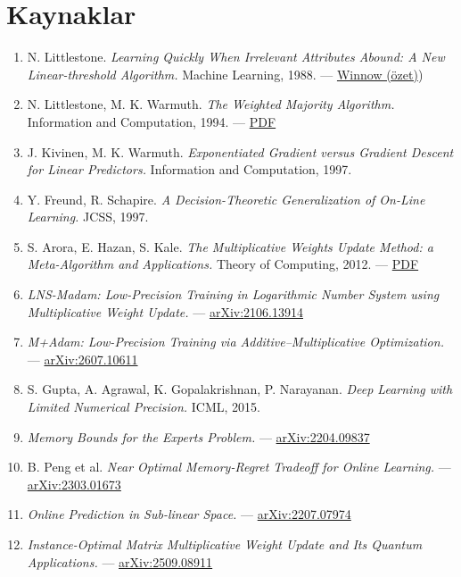 \documentclass[11pt]{article}
\begin{document}
\section*{Kaynaklar}
\begin{enumerate}\item N. Littlestone. \emph{Learning Quickly When Irrelevant Attributes Abound: A New Linear-threshold Algorithm.} Machine Learning, 1988. — \href{https://en.wikipedia.org/wiki/Winnow_(algorithm}{Winnow (özet)})
\item N. Littlestone, M. K. Warmuth. \emph{The Weighted Majority Algorithm.} Information and Computation, 1994. — \href{https://mwarmuth.bitbucket.io/pubs/C14.pdf}{PDF}
\item J. Kivinen, M. K. Warmuth. \emph{Exponentiated Gradient versus Gradient Descent for Linear Predictors.} Information and Computation, 1997.
\item Y. Freund, R. Schapire. \emph{A Decision-Theoretic Generalization of On-Line Learning.} JCSS, 1997.
\item S. Arora, E. Hazan, S. Kale. \emph{The Multiplicative Weights Update Method: a Meta-Algorithm and Applications.} Theory of Computing, 2012. — \href{https://theoryofcomputing.org/articles/v008a006/v008a006.pdf}{PDF}
\item \emph{LNS-Madam: Low-Precision Training in Logarithmic Number System using Multiplicative Weight Update.} — \href{https://arxiv.org/pdf/2106.13914}{arXiv:2106.13914}
\item \emph{M+Adam: Low-Precision Training via Additive–Multiplicative Optimization.} — \href{https://arxiv.org/html/2607.10611}{arXiv:2607.10611}
\item S. Gupta, A. Agrawal, K. Gopalakrishnan, P. Narayanan. \emph{Deep Learning with Limited Numerical Precision.} ICML, 2015.
\item \emph{Memory Bounds for the Experts Problem.} — \href{https://arxiv.org/pdf/2204.09837}{arXiv:2204.09837}
\item B. Peng et al. \emph{Near Optimal Memory-Regret Tradeoff for Online Learning.} — \href{https://arxiv.org/pdf/2303.01673}{arXiv:2303.01673}
\item \emph{Online Prediction in Sub-linear Space.} — \href{https://arxiv.org/pdf/2207.07974}{arXiv:2207.07974}
\item \emph{Instance-Optimal Matrix Multiplicative Weight Update and Its Quantum Applications.} — \href{https://arxiv.org/abs/2509.08911}{arXiv:2509.08911}
\end{enumerate}
\end{document}
